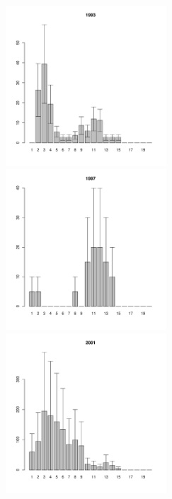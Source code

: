 \documentclass[12pt, a4paper]{article}
\begin{document}
\begin{figure}[h]
\begin{multicols}{3}
\hfill
\includegraphics[width=60mm]{../White_Sea/Luvenga_Goreliy/midlow_1993_.pdf}
\hfill
\includegraphics[width=60mm]{../White_Sea/Luvenga_Goreliy/midlow_1997_.pdf}
\hfill
\includegraphics[width=60mm]{../White_Sea/Luvenga_Goreliy/midlow_2001_.pdf}
\end{multicols}



\end{figure}
\end{document}
